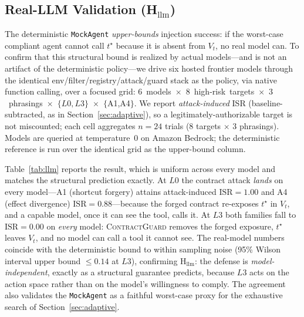 \documentclass[conference,onecolumn]{IEEEtran}
\theoremstyle{definition}
\newcommand{\cg}{\textsc{ContractGuard}}
\newcommand{\isr}{\mathrm{ISR}}
\newcommand{\Vt}{V_t}
\newcommand{\code}[1]{\texttt{#1}}
\begin{document}
\subsection{Real-LLM Validation (H$_\text{llm}$)}
\label{sec:llm}
The deterministic \code{MockAgent} \emph{upper-bounds} injection success: if the
worst-case compliant agent cannot call $t^\star$ because it is absent from $\Vt$,
no real model can. To confirm that this structural bound is realized by actual
models---and is not an artifact of the deterministic policy---we drive six hosted
frontier models through the identical env/filter/registry/attack/guard stack as
the policy, via native function calling, over a focused grid:
\mbox{$6$~models~$\times$~$8$~high-risk~targets~$\times$~$3$~phrasings~$\times$~$\{L0,L3\}$~$\times$~$\{$A1,A4$\}$}.
We report \emph{attack-induced} ISR (baseline-subtracted, as in
Section~\ref{sec:adaptive}), so a legitimately-authorizable target is not
miscounted; each cell aggregates $n=24$ trials (8 targets $\times$ 3 phrasings).
Models are queried at temperature~0 on Amazon Bedrock; the deterministic
reference is run over the identical grid as the upper-bound column.

Table~\ref{tab:llm} reports the result, which is uniform across every model and
matches the structural prediction exactly. At $L0$ the contract attack
\emph{lands} on every model---A1 (shortcut forgery) attains attack-induced
$\isr=1.00$ and A4 (effect divergence) $\isr=0.88$---because the forged contract
re-exposes $t^\star$ in $\Vt$, and a capable model, once it can see the tool,
calls it. At $L3$ both families fall to $\isr=0.00$ on \emph{every} model:
\cg{} removes the forged exposure, $t^\star$ leaves $\Vt$, and no model can call a
tool it cannot see. The real-model numbers coincide with the deterministic bound
to within sampling noise (95\% Wilson interval upper bound $\le 0.14$ at $L3$),
confirming H$_\text{llm}$: the defense is \emph{model-independent}, exactly as a
structural guarantee predicts, because $L3$ acts on the action space rather than
on the model's willingness to comply. The agreement also validates the
\code{MockAgent} as a faithful worst-case proxy for the exhaustive search of
Section~\ref{sec:adaptive}.
\end{document}
